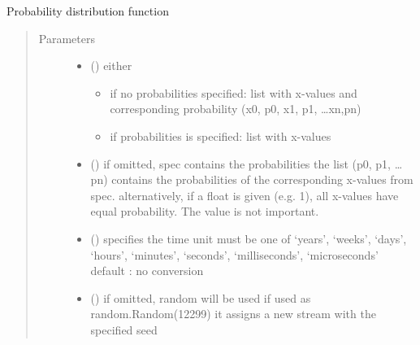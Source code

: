 \documentclass[letterpaper,10pt,english]{sphinxmanual}
\begin{document}
\begin{fulllineitems}
\label{\detokenize{Reference:salabim.Pdf}}
Probability distribution function
\begin{quote}\begin{description}
\item[{Parameters}] \leavevmode\begin{itemize}
\item {} 
 () \textendash{} 
either
\begin{itemize}
\item {} 
if no probabilities specified: 
list with x-values and corresponding probability
(x0, p0, x1, p1, …xn,pn) 

\item {} 
if probabilities is specified: 
list with x-values

\end{itemize}


\item {} 
 (\sphinxstyleliteralemphasis{\sphinxupquote{, }}) \textendash{} if omitted, spec contains the probabilities 
the list (p0, p1, …pn) contains the probabilities of the corresponding
x-values from spec. 
alternatively, if a float is given (e.g. 1), all x-values
have equal probability. The value is not important.

\item {} 
 () \textendash{} specifies the time unit 
must be one of ‘years’, ‘weeks’, ‘days’, ‘hours’, ‘minutes’, ‘seconds’, ‘milliseconds’, ‘microseconds’ 
default : no conversion 

\item {} 
 () \textendash{} if omitted, random will be used 
if used as random.Random(12299)
it assigns a new stream with the specified seed


\end{itemize}
\end{description}
\end{quote}
\end{fulllineitems}
\end{document}
